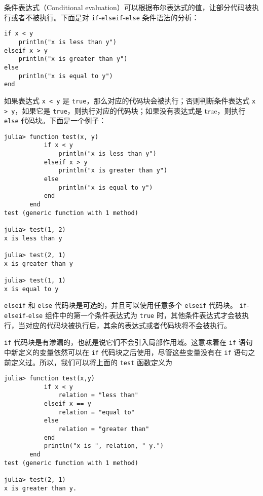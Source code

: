 条件表达式（Conditional evaluation）可以根据布尔表达式的值，让部分代码被执行或者不被执行。下面是对 \texttt{if}-\texttt{elseif}-\texttt{else} 条件语法的分析：




\begin{verbatim}
if x < y
    println("x is less than y")
elseif x > y
    println("x is greater than y")
else
    println("x is equal to y")
end
\end{verbatim}



如果表达式 \texttt{x < y} 是 \texttt{true}，那么对应的代码块会被执行；否则判断条件表达式 \texttt{x > y}，如果它是 \texttt{true}，则执行对应的代码块；如果没有表达式是 true，则执行 \texttt{else} 代码块。下面是一个例子：




\begin{verbatim}
julia> function test(x, y)
           if x < y
               println("x is less than y")
           elseif x > y
               println("x is greater than y")
           else
               println("x is equal to y")
           end
       end
test (generic function with 1 method)

julia> test(1, 2)
x is less than y

julia> test(2, 1)
x is greater than y

julia> test(1, 1)
x is equal to y
\end{verbatim}



\texttt{elseif} 和 \texttt{else} 代码块是可选的，并且可以使用任意多个 \texttt{elseif} 代码块。 \texttt{if}-\texttt{elseif}-\texttt{else} 组件中的第一个条件表达式为 \texttt{true} 时，其他条件表达式才会被执行，当对应的代码块被执行后，其余的表达式或者代码块将不会被执行。



\texttt{if} 代码块是{\textquotedbl}有渗漏的{\textquotedbl}，也就是说它们不会引入局部作用域。这意味着在 \texttt{if} 语句中新定义的变量依然可以在 \texttt{if} 代码块之后使用，尽管这些变量没有在 \texttt{if} 语句之前定义过。所以，我们可以将上面的 \texttt{test} 函数定义为




\begin{verbatim}
julia> function test(x,y)
           if x < y
               relation = "less than"
           elseif x == y
               relation = "equal to"
           else
               relation = "greater than"
           end
           println("x is ", relation, " y.")
       end
test (generic function with 1 method)

julia> test(2, 1)
x is greater than y.
\end{verbatim}



